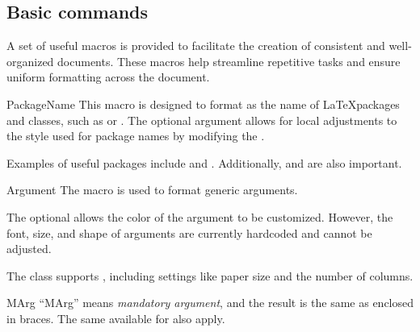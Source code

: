 \documentclass[11pt, outdir = ./out]{article}
\begin{document}
\begin{latexcode}
    \usepackage{docs}
\end{latexcode}

\subsection{Basic commands}

A set of useful macros is provided to facilitate the creation of consistent and well-organized documents. These macros help streamline repetitive tasks and ensure uniform formatting across the document.

\begin{Macrodef}{PackageName}{}{}
    This macro is designed to format  as the name of \LaTeX packages and classes, such as  or . The optional argument  allows for local adjustments to the style used for package names by modifying the .
\end{Macrodef}

\begin{DocsExample}
    Examples of useful packages include  and . Additionally,  and  are also important.
\end{DocsExample}

\begin{Macrodef}{Argument}{}{}
    The  macro is used to format generic arguments.

    The optional  allows the color of the argument to be customized. However, the font, size, and shape of arguments are currently hardcoded and cannot be adjusted.
\end{Macrodef}

\begin{DocsExample}
    The  class supports , including settings like paper size and the number of columns.
\end{DocsExample}

\begin{Macrodef}{MArg}{}{}
    ``MArg'' means \textit{mandatory argument}, and the result is the same as  enclosed in braces. The same  available for  also apply.
\end{Macrodef}
\end{document}
